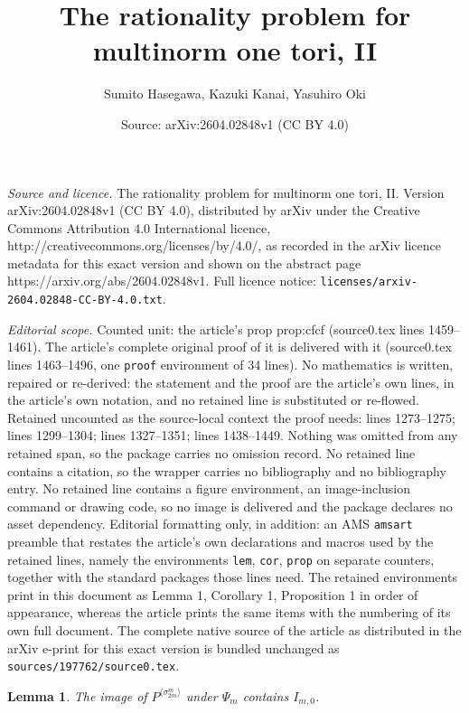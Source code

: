 \documentclass[10pt,a4paper]{amsart}
\title{The rationality problem for multinorm one tori, II}
\author{Sumito Hasegawa, Kazuki Kanai, Yasuhiro Oki}
\date{Source: arXiv:2604.02848v1 (CC BY 4.0)}
\newtheorem{lem}{Lemma}
\begin{document}
\maketitle

\noindent\emph{Source and licence.} The rationality problem for multinorm one tori, II. Version arXiv:2604.02848v1 (CC BY 4.0), distributed by arXiv under the Creative Commons Attribution 4.0 International licence, http://creativecommons.org/licenses/by/4.0/, as recorded in the arXiv licence metadata for this exact version and shown on the abstract page https://arxiv.org/abs/2604.02848v1. Full licence notice: \texttt{licenses/arxiv-2604.02848-CC-BY-4.0.txt}.\par\smallskip

\noindent\textit{Editorial scope.} Counted unit: the article's prop prop:cfcf (source0.tex lines 1459--1461). The article's complete original proof of it is delivered with it (source0.tex lines 1463--1496, one \texttt{proof} environment of 34 lines). No mathematics is written, repaired or re-derived: the statement and the proof are the article's own lines, in the article's own notation, and no retained line is substituted or re-flowed.  Retained uncounted as the source-local context the proof needs: lines 1273--1275; lines 1299--1304; lines 1327--1351; lines 1438--1449.  Nothing was omitted from any retained span, so the package carries no omission record.  No retained line contains a citation, so the wrapper carries no bibliography and no bibliography entry.  No retained line contains a figure environment, an image-inclusion command or drawing code, so no image is delivered and the package declares no asset dependency.  Editorial formatting only, in addition: an AMS \texttt{amsart} preamble that restates the article's own declarations and macros used by the retained lines, namely the environments \texttt{lem}, \texttt{cor}, \texttt{prop} on separate counters, together with the standard packages those lines need.  The retained environments print in this document as Lemma 1, Corollary 1, Proposition 1 in order of appearance, whereas the article prints the same items with the numbering of its own full document.  The complete native source of the article as distributed in the arXiv e-print for this exact version is bundled unchanged as \texttt{sources/197762/source0.tex}.
\begin{lem}\label{lem:zfsj}
The image of $P^{\langle \sigma_{2m}^{m}\rangle}$ under $\Psi_{m}$ contains $I_{m,0}$. 
\end{lem}
\end{document}
